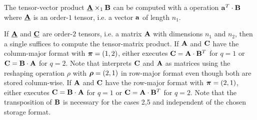 




The tensor-vector product $\underline{\mathbf{A}} \times_1 \mathbf{B}$ can be computed with a  operation $\mathbf{a}^T \cdot \mathbf{B}$ where $\underline{\mathbf{A}}$ is an order-$1$ tensor, i.e. a vector $\mathbf{a}$ of length $n_1$.

If $\underline{\mathbf{A}}$ and $\underline{\mathbf{C}}$ are order-$2$ tensors, i.e. a matrix $\mathbf{A}$ with dimensions $n_1$ and $n_2$, then a single  suffices to compute the tensor-matrix product. 
If $\mathbf{A}$ and $\mathbf{C}$ have the column-major format with $\boldsymbol{\pi}=(1,2)$,  either executes $\mathbf{C} = \mathbf{A} \cdot \mathbf{B}^T$ for $q =1$ or $\mathbf{C} = \mathbf{B} \cdot \mathbf{A}$ for $q=2$.
Note that  interprets $\mathbf{C}$ and $\mathbf{A}$ as matrices using the reshaping operation $\rho$ with $\boldsymbol{\rho} = (2,1)$ in row-major format even though both are stored column-wise.
If $\mathbf{A}$ and $\mathbf{C}$ have the row-major format with $\boldsymbol{\pi}=(2,1)$,  either executes $\mathbf{C} = \mathbf{B} \cdot \mathbf{A}$ for $q =1$ or $\mathbf{C} = \mathbf{A} \cdot \mathbf{B}^T$ for $q=2$. 
Note that the transposition of $\mathbf{B}$ is necessary for the cases 2,5 and independent of the chosen storage format.

